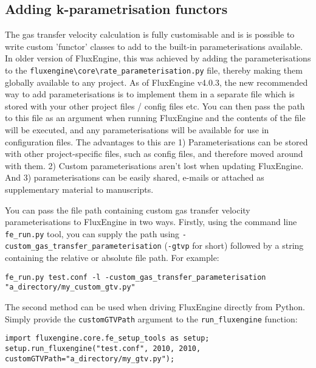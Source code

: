 \documentclass[]{scrartcl}
\begin{document}
\subsection{Adding k-parametrisation functors}
The gas transfer velocity calculation is fully customisable and is is possible to write custom 'functor' classes to add to the built-in parameterisations available. In older version of FluxEngine, this was achieved by adding the parameterisations to the \texttt{fluxengine{\textbackslash}core{\textbackslash}rate\_parameterisation.py} file, thereby making them globally available to any project. As of FluxEngine v4.0.3, the new recommended way to add parameterisations is to implement them in a separate file which is stored with your other project files / config files etc. You can then pass the path to this file as an argument when running FluxEngine and the contents of the file will be executed, and any parameterisations will be available for use in configuration files. The advantages to this are 1) Parameterisations can be stored with other project-specific files, such as config files, and therefore moved around with them. 2) Custom parameterisations aren't lost when updating FluxEngine. And 3) parameterisations can be easily shared, e-mails or attached as supplementary material to manuscripts.

You can pass the file path containing custom gas transfer velocity parameterisations to FluxEngine in two ways. Firstly, using the command line \texttt{fe\_run.py} tool, you can supply the path using \texttt{-custom\_gas\_transfer\_parameterisation} (\texttt{-gtvp} for short) followed by a string containing the relative or absolute file path. For example:

\begin{lstlisting}
fe_run.py test.conf -l -custom_gas_transfer_parameterisation "a_directory/my_custom_gtv.py"
\end{lstlisting}

The second method can be used when driving FluxEngine directly from Python. Simply provide the \texttt{customGTVPath} argument to the \texttt{run\_fluxengine} function:

\begin{lstlisting}
import fluxengine.core.fe_setup_tools as setup;
setup.run_fluxengine("test.conf", 2010, 2010, customGTVPath="a_directory/my_gtv.py");
\end{lstlisting}
\end{document}
